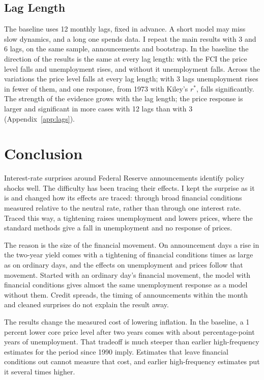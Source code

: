 \documentclass[11pt]{article}
\newcommand{\rs}{r^{*}}
\begin{document}
\subsection{Lag Length}\label{sec:laglen}
The baseline uses 12 monthly lags, fixed in advance. A short model may miss slow dynamics, and a long one spends data. I repeat the main results with 3 and 6 lags, on the same sample, announcements and bootstrap. In the baseline the direction of the results is the same at every lag length: with the FCI the price level falls and unemployment rises, and without it unemployment falls. Across the variations the price level falls at every lag length; with 3 lags unemployment rises in fewer of them, and one response, from 1973 with Kiley's $\rs$, falls significantly. The strength of the evidence grows with the lag length; the price response is larger and significant in more cases with 12 lags than with 3 (Appendix~\ref{app:lags}).

\FloatBarrier
\section{Conclusion}\label{sec:policy}
Interest-rate surprises around Federal Reserve announcements identify policy shocks well. The difficulty has been tracing their effects. I kept the surprise as it is and changed how its effects are traced: through broad financial conditions measured relative to the neutral rate, rather than through one interest rate. Traced this way, a tightening raises unemployment and lowers prices, where the standard methods give a fall in unemployment and no response of prices.

The reason is the size of the financial movement. On announcement days a rise in the two-year yield comes with a tightening of financial conditions  times as large as on ordinary days, and the effects on unemployment and prices follow that movement. Started with an ordinary day's financial movement, the model with financial conditions gives almost the same unemployment response as a model without them. Credit spreads, the timing of announcements within the month and cleaned surprises do not explain the result away.

The results change the measured cost of lowering inflation. In the baseline, a 1 percent lower core price level after two years comes with about  percentage-point years of unemployment. That tradeoff is much steeper than earlier high-frequency estimates for the period since 1990 imply. Estimates that leave financial conditions out cannot measure that cost, and earlier high-frequency estimates put it several times higher.
\end{document}

